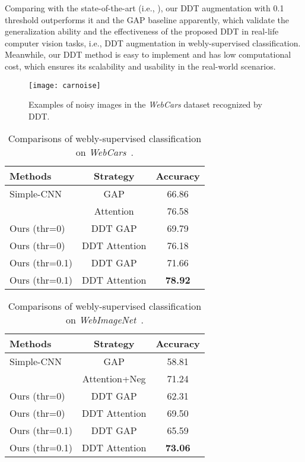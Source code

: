 \documentclass[twocolumn]{svjour3}          \smartqed  \usepackage{graphicx}
\begin{document}
Comparing with the state-of-the-art (i.e., \citet{bohan2017}), our DDT augmentation with 0.1 threshold outperforms it and the GAP baseline apparently, which validate the generalization ability and the effectiveness of the proposed DDT in real-life computer vision tasks, i.e., DDT augmentation in webly-supervised classification. Meanwhile, our DDT method is easy to implement and has low computational cost, which ensures its scalability and usability in the real-world scenarios.

\begin{figure}[t]
 \centering
 \texttt{[image: carnoise]}
 \caption{Examples of noisy images in the \emph{WebCars} dataset recognized by DDT.}
 \label{fig:carnoise}
\end{figure}

\begin{table}[t!]
 \caption{Comparisons of webly-supervised classification on \emph{WebCars}~\citep{bohan2017}.} \label{table:webcar}
 \centering
\begin{tabular}{l|c||c}
  \hline
  {Methods}  & Strategy & {{Accuracy}} \\  
  \hline
  Simple-CNN & GAP & 66.86 \\
  \citet{bohan2017}  & Attention & 76.58  \\
  \hline
  Ours (thr=0) & DDT  GAP & 69.79\\
  Ours (thr=0) & DDT  Attention & {76.18} \\
  Ours (thr=0.1) & DDT  GAP & 71.66\\
  Ours (thr=0.1) & DDT  Attention & \textbf{78.92} \\
  \hline
 \end{tabular}
\end{table}

\begin{table}[t!]
 \caption{Comparisons of webly-supervised classification on \emph{WebImageNet}~\citep{bohan2017}.} \label{table:webimagenet}
 \centering
 \begin{tabular}{l|c||c}
  \hline
  {Methods}  & Strategy & {{Accuracy}} \\  
  \hline
  Simple-CNN & GAP & 58.81 \\
  \citet{bohan2017}  & Attention+Neg\footnotemark[1] & 71.24  \\
  \hline
  Ours (thr=0) & DDT  GAP & 62.31\\
  Ours (thr=0) & DDT  Attention & {69.50} \\
  Ours (thr=0.1) & DDT  GAP & 65.59\\
  Ours (thr=0.1) & DDT  Attention	 & \textbf{73.06} \\
  \hline
 \end{tabular}
\end{table}
\end{document}
